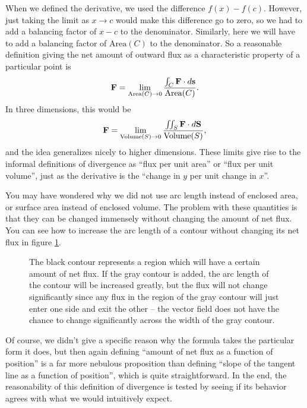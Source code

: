 \documentclass{myarticle}
\let\div\relax
\DeclareMathOperator{\div}{div}
\renewcommand{\vec}[1]{\mathbf{#1}}
\theoremstyle{nospace}
\newtheorem{old series theorem}{Theorem}
\newenvironment{series theorem}{\begin{mdframed}\begin{old series theorem}}{\end{old series theorem}\end{mdframed}}
\begin{document}
When we defined the derivative, we used the difference $f(x) - f(c)$. However, just taking the limit as $x \to c$ would make this difference go to zero, so we had to add a balancing factor of $x - c$ to the denominator. Similarly, here we will have to add a balancing factor of $\text{Area}(C)$ to the denominator. So a reasonable definition giving the net amount of outward flux as a characteristic property of a particular point is \[ \div \vec{F} = \lim_{\text{Area}(C) \to 0} \frac{\int_C \vec{F} \cdot d\vec{s}}{\text{Area}(C)}. \] In three dimensions, this would be \[ \div \vec{F} = \lim_{\text{Volume}(S) \to 0} \frac{\iint_S \vec{F} \cdot d\vec{S}}{\text{Volume}(S)}, \] and the idea generalizes nicely to higher dimensions. These limits give rise to the informal definitions of divergence as ``flux per unit area'' or ``flux per unit volume'', just as the derivative is the ``change in $y$ per unit change in $x$''.

You may have wondered why we did not use arc length instead of enclosed area, or surface area instead of enclosed volume. The problem with these quantities is that they can be changed immensely without changing the amount of net flux. You can see how to increase the arc length of a contour without changing its net flux in figure \ref{fig:ripple flux}.

\begin{figure}[htb!] \centering
{}
\caption{The black contour represents a region which will have a certain amount of net flux. If the gray contour is added, the arc length of the contour will be increased greatly, but the flux will not change significantly since any flux in the region of the gray contour will just enter one side and exit the other -- the vector field does not have the chance to change significantly across the width of the gray contour.}
\label{fig:ripple flux}
\end{figure}

Of course, we didn't give a specific reason why the formula takes the particular form it does, but then again defining ``amount of net flux as a function of position'' is a far more nebulous proposition than defining ``slope of the tangent line as a function of position'', which is quite straightforward. In the end, the reasonability of this definition of divergence is tested by seeing if its behavior agrees with what we would intuitively expect.
\end{document}

